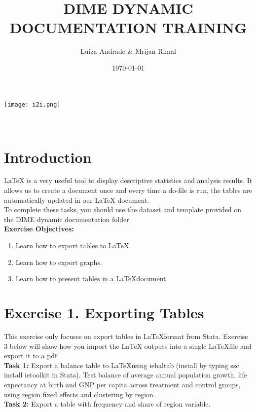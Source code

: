 \documentclass[12pts]{report}
\title{DIME DYNAMIC DOCUMENTATION TRAINING }
\author{Luiza Andrade \& Mrijan Rimal}
\date{\today}
\begin{document}
	

\makeatletter
\begin{titlepage}
	\begin{center}
		\texttt{[image: i2i.png]}\\[10ex]
		{\LARGE \bfseries  \@title }\\[2ex] 
		{\Large  \@author}\\[20ex] 
		{\large \@date}
	\end{center}
\end{titlepage}
\makeatother

\section*{Introduction}
LaTeX is a very useful tool to display descriptive statistics and analysis results. It allows us to create a document once and every time a do-file is run, the tables are automatically updated in our LaTeX document. \\

To complete these tasks, you should use the dataset and template provided on the DIME dynamic documentation folder. \\

\textbf{Exercise Objectives:}
\begin{enumerate}
	\item Learn how to export tables to \LaTeX.
	\item Learn how to export graphs.
	\item Learn how to present tables in a \LaTeX document
\end{enumerate}

\section*{Exercise 1. Exporting Tables}
This exercise only focuses on export tables in \LaTeX \space format from Stata. Exercise 3 below will show how you import the LaTeX outputs into a single \LaTeX \space file and export it to a pdf. \\

\textbf{Task 1:}  Export a balance table to \LaTeX \space using iebaltab (install by typing ssc install ietoolkit in Stata). Test balance of average annual population growth, life expectancy at birth and GNP per capita across treatment and control groups, using region fixed effects and clustering by region.\\

\textbf{Task 2:}  Export a table with frequency and share of region variable. 
\end{document}
